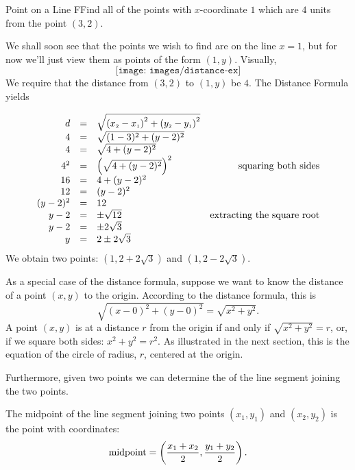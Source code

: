 \begin{example}{Point on a Line}
	FFind all of the points with $x$-coordinate $1$ which are $4$ units from the point $(3,2)$. 
\end{example}
\begin{solution}
	We shall soon see that the points we wish to find are on the line $x=1$, but for now we'll just view them as points of the form $(1,y)$.  Visually,\\
	$$ \texttt{[image: images/distance-ex]}$$
	We require that the distance from $(3,2)$ to $(1,y)$ be $4$.  The Distance Formula yields
	
	\[ \begin{array}{rclr} 
	d &  = & \sqrt{\left(x_{\mbox{\tiny$2$}}-x_{\mbox{\tiny$1$}}\right)^2+\left(y_{\mbox{\tiny$2$}}-y_{\mbox{\tiny$1$}}\right)^2}  & \\
	4 &  = & \sqrt{(1-3)^2+(y-2)^2} & \\
	4  & = & \sqrt{4+(y-2)^2} & \\ 
	4^2 & = & \left(\sqrt{4+(y-2)^2}\right)^2 &  \mbox{squaring both sides} \\
	16 & = & 4+(y-2)^2 & \\
	12 & = & (y-2)^2 & \\
	(y-2)^2 & = & 12 &  \\
	y - 2 & = & \pm \sqrt{12} & \mbox{extracting the square root} \\
	y-2 & = & \pm 2 \sqrt{3} & \\
	y & = & 2 \pm 2 \sqrt{3}  & 
	\end{array} \]
	We obtain two points:  $(1, 2 + 2 \sqrt{3})$ and $(1, 2-2 \sqrt{3}).$  
	
\end{solution}		

As a special case of the distance formula, suppose we want to know the
distance of a point $(x,y)$ to the origin.  According to the distance
formula, this is $$\sqrt{(x-0)^2+(y-0)^2}=\sqrt{x^2+y^2}.$$
A point $(x,y)$ is at a distance $r$ from the origin if and only if
$\sqrt{x^2+y^2}=r$, or, if we square both sides: $x^2+y^2=r^2$.  As illustrated
in the next section, this is the equation of the circle of radius, $r$, centered at the origin.

Furthermore, given two points we can determine the  of the line segment joining the two points.\\

\begin{formulabox}
The midpoint of the line segment joining two points $(x_1,y_1)$ and 
$(x_2,y_2)$ is the point with coordinates:
$$\hbox{midpoint}=\left(\frac{x_1+x_2}{2},\frac{y_1+y_2}{2}\right).$$
\end{formulabox}

